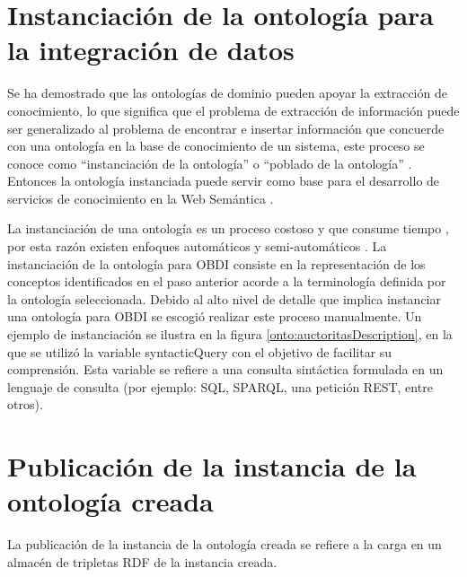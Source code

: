 \section{Instanciación de la ontología para la integración de datos}

Se ha demostrado que las ontologías de dominio pueden apoyar la extracción de conocimiento, lo que significa que el problema de extracción de información puede ser generalizado al problema de encontrar e insertar información que concuerde con una ontología en la base de conocimiento de un sistema, este proceso se conoce como ``instanciación de la ontología'' o ``poblado de la ontología'' \citep{JANNACH2009136}. Entonces la ontología instanciada puede servir como base para el desarrollo de servicios de conocimiento en la Web Semántica \citep{1179189}.

La instanciación de una ontología es un proceso costoso y que consume tiempo \citep{10.1007/978-0-387-87685-6_30}, por esta razón existen enfoques automáticos \citep{1179189,JANNACH2009136} y semi-automáticos \citep{10.1007/978-0-387-87685-6_30}. La instanciación de la ontología para OBDI consiste en la representación de los conceptos identificados en el paso anterior acorde a la terminología definida por la ontología seleccionada. Debido al alto nivel de detalle que implica instanciar una ontología para OBDI se escogió realizar este proceso manualmente. Un ejemplo de instanciación se ilustra en la figura \ref{onto:auctoritasDescription}, en la que se utilizó la variable syntacticQuery con el objetivo de facilitar su comprensión. Esta variable se refiere a una consulta sintáctica formulada en un lenguaje de consulta (por ejemplo: SQL, SPARQL, una petición REST, entre otros).


\section{Publicación de la instancia de la ontología creada}

La publicación de la instancia de la ontología creada se refiere a la carga en un almacén de tripletas RDF de la instancia creada.


